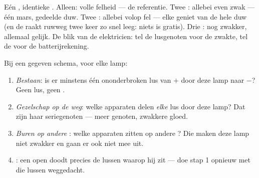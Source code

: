 \begin{example}\label{ex:g7:circuits-series-parallel:brightness}
Eén , identieke . Alleen: volle felheid --- de
referentie. Twee : allebei even zwak --- één mars, gedeelde
duw. Twee : allebei volop fel --- elke  geniet van de
hele duw (en de  raakt ruwweg twee keer zo snel leeg: niets
is gratis). Drie : nog zwakker, allemaal gelijk. De blik van
de elektricien: tel de lusgenoten voor de zwakte, tel de
 voor de batterijrekening.
\end{example}

\begin{method}\label{met:g7:circuits-series-parallel:predict}
Bij een gegeven schema, voor elke lamp:
\begin{enumerate}
  \item \emph{Bestaan}: is er minstens één ononderbroken lus van $+$
        door deze lamp naar $-$? Geen lus, geen .
  \item \emph{Gezelschap op de weg}: welke apparaten delen
        \emph{elke} lus door deze lamp? Dat zijn haar seriegenoten
        --- meer genoten, zwakkere gloed.
  \item \emph{Buren op andere }: welke apparaten zitten op
        andere ? Die maken deze lamp niet zwakker en gaan er
        ook niet mee uit.
  \item \emph{}: een open  doodt precies de
        lussen waarop hij zit --- doe stap 1 opnieuw met die lussen
        weggedacht.
\end{enumerate}
\end{method}

